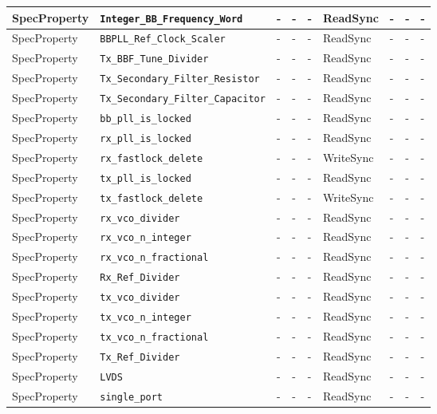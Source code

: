 \documentclass{article}
\begin{document}
\begin{landscape}
\begin{scriptsize}
\begin{longtable}{|p{2cm}|p{4cm}|p{1cm}|p{2cm}|p{2cm}|p{2cm}|p{2cm}|p{1cm}|p{4.58cm}|}
			\hline
			SpecProperty & \verb+Integer_BB_Frequency_Word+ & - & - & - & ReadSync & - & - & - \\
			\hline
			SpecProperty & \verb+BBPLL_Ref_Clock_Scaler+ & - & - & - & ReadSync & - & - & - \\
			\hline
			SpecProperty & \verb+Tx_BBF_Tune_Divider+ & - & - & - & ReadSync & - & - & - \\
			\hline
			SpecProperty & \verb+Tx_Secondary_Filter_Resistor+ & - & - & - & ReadSync & - & - & - \\
			\hline
			SpecProperty & \verb+Tx_Secondary_Filter_Capacitor+ & - & - & - & ReadSync & - & - & - \\
			\hline
			SpecProperty & \verb+bb_pll_is_locked+ & - & - & - & ReadSync  & - & - & - \\
			\hline
			SpecProperty & \verb+rx_pll_is_locked+ & - & - & - & ReadSync  & - & - & - \\
			\hline
			SpecProperty & \verb+rx_fastlock_delete+ & - & - & - & WriteSync & - & - & - \\
			\hline
			SpecProperty & \verb+tx_pll_is_locked+ & - & - & - & ReadSync  & - & - & - \\
			\hline
			SpecProperty & \verb+tx_fastlock_delete+ & - & - & - & WriteSync & - & - & - \\
			\hline
			SpecProperty & \verb+rx_vco_divider+ & - & - & - & ReadSync  & - & - & - \\
			\hline
			SpecProperty & \verb+rx_vco_n_integer+ & - & - & - & ReadSync  & - & - & - \\
			\hline
			SpecProperty & \verb+rx_vco_n_fractional+ & - & - & - & ReadSync  & - & - & - \\
			\hline
			SpecProperty & \verb+Rx_Ref_Divider+ & - & - & - & ReadSync  & - & - & - \\
			\hline
			SpecProperty & \verb+tx_vco_divider+ & - & - & - & ReadSync  & - & - & - \\
			\hline
			SpecProperty & \verb+tx_vco_n_integer+ & - & - & - & ReadSync  & - & - & - \\
			\hline
			SpecProperty & \verb+tx_vco_n_fractional+ & - & - & - & ReadSync  & - & - & - \\
			\hline
			SpecProperty & \verb+Tx_Ref_Divider+ & - & - & - & ReadSync  & - & - & - \\
			\hline
			SpecProperty & \verb+LVDS+ & - & - & - & ReadSync & - & - & - \\
			\hline
			SpecProperty & \verb+single_port+ & - & - & - & ReadSync & - & - & - \\

\end{longtable}
\end{scriptsize}
\end{landscape}
\end{document}

